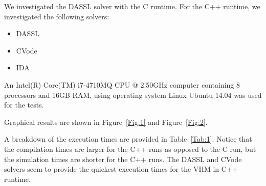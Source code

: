 \documentclass[10pt]{article}
\begin{document}
We investigated the DASSL solver with the {\sf C} runtime. For the {\sf C++} runtime, we investigated the following solvers:
\begin{itemize}
 \item DASSL
 \item CVode
 \item IDA
\end{itemize}

An Intel(R) Core(TM) i7-4710MQ CPU @ 2.50GHz computer containing 8 processors and 16GB RAM, using operating system Linux Ubuntu 14.04 was used for the tests.

Graphical results are shown in Figure~\ref{Fig:1} and Figure~\ref{Fig:2}.

A breakdown of the execution times are provided in Table~\ref{Tab:1}. Notice that the compilation times are larger for the {\sf C++} runs as opposed to the {\sf C} run, but the simulation times are shorter for the {\sf C++} runs. The DASSL and CVode solvers seem to provide the quickest execution times for the VHM in {\sf C++} runtime.
\end{document}
